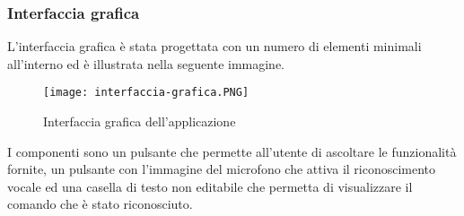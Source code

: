 		\subsubsection{Interfaccia grafica}
		L'interfaccia grafica è stata progettata con un numero di elementi minimali all'interno ed è illustrata nella seguente immagine.
		\begin{figure}[htbp]
			\begin{center}
				\texttt{[image: interfaccia-grafica.PNG]}
				\caption{Interfaccia grafica dell'applicazione}
			\end{center}
		\end{figure}
	
		I componenti sono un pulsante che permette all'utente di ascoltare le funzionalità fornite, un pulsante con l'immagine del microfono che attiva il riconoscimento vocale ed una casella di testo non editabile che permetta di visualizzare il comando che è stato riconosciuto.		
